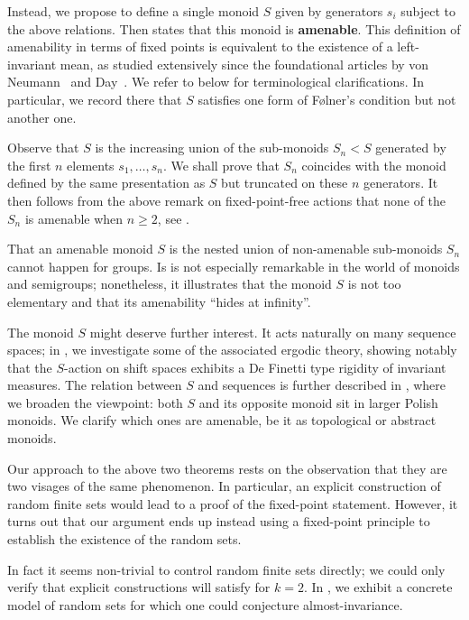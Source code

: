 \documentclass[12pt, pdflatex]{amsart}
\theoremstyle{definition}
\numberwithin{equation}{section}
\numberwithin{theorem}{section}
\begin{document}
Instead, we propose to define a single monoid $S$ given by generators $s_i$ subject to the above relations. Then  states that this monoid is \textbf{amenable}. This definition of amenability in terms of fixed points is equivalent to the existence of a left-invariant mean, as studied extensively since the foundational articles by von Neumann~\cite{vonNeumann29} and Day~\cite{Day57}. We refer to  below for terminological clarifications. In particular, we record there that $S$ satisfies one form of F\o lner's condition but not another one.

Observe that $S$ is the increasing union of the sub-monoids $S_n<S$ generated by the first $n$ elements $s_1, \ldots , s_n$. We shall prove that $S_n$ coincides with the monoid defined by the same presentation as $S$ but truncated on these $n$ generators. It then follows from the above remark on fixed-point-free actions that none of the $S_n$ is amenable when $n\geq 2$, see .

That an amenable monoid $S$ is the nested union of non-amenable sub-monoids $S_n$ cannot happen for groups. Is is not especially remarkable in the world of monoids and semigroups; nonetheless, it illustrates that the monoid $S$ is not too elementary and that its amenability ``hides at infinity''.

The monoid $S$ might deserve further interest. It acts naturally on many sequence spaces; in , we investigate some of the associated ergodic theory, showing notably that the $S$-action on shift spaces exhibits a De Finetti type rigidity of invariant measures. The relation between $S$ and sequences is further described in , where we broaden the viewpoint: both $S$ and its opposite monoid sit in larger Polish monoids. We clarify which ones are amenable, be it as topological or abstract monoids.


\medskip
Our approach to the above two theorems rests on the observation that they are two visages of the same phenomenon. In particular, an explicit construction of random finite sets would lead to a proof of the fixed-point statement. However, it turns out that our argument ends up instead using a fixed-point principle to establish the existence of the random sets.

In fact it seems non-trivial to control random finite sets directly; we could only verify that explicit constructions will satisfy  for $k=2$. In , we exhibit a concrete model of random sets for which one could conjecture almost-invariance.
\end{document}
